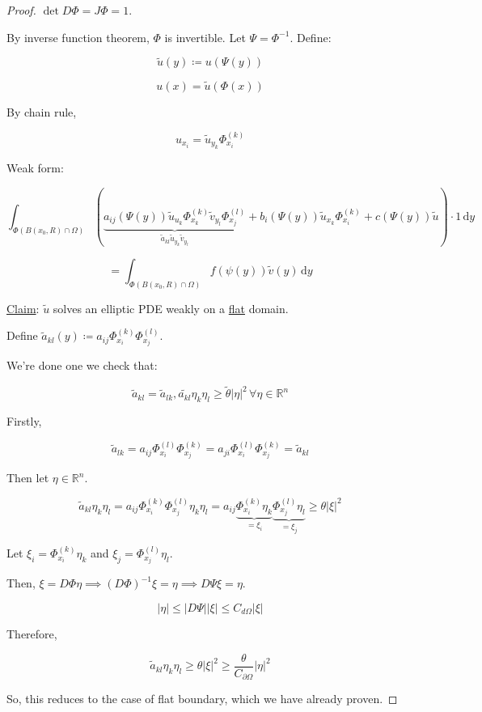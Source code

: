 \documentclass{article}
\theoremstyle{definition}
\begin{document}
\begin{proof}
    \(\det D \Phi = J \Phi = 1\).

    By inverse function theorem, \(\Phi\) is invertible. Let \(\Psi = \Phi ^{-1}\). Define:

    \[
        \widetilde{u} (y) \coloneqq u(\Psi(y))
    \]

    \[
        u(x) = \widetilde{u}(\Phi(x))
    \]

    By chain rule,

    \[
        u_{x_i} = \widetilde{u}_{y_k} \Phi_{x_i} ^{(k)}
    \]

    Weak form:

    \[
        \int_{\Phi(B(x_0,R)\cap \Omega)} \left(\underbrace{a_{ij} (\Psi(y))\widetilde{u}_{u_k} \Phi_{x_k} ^{(k)} \widetilde{v}_{y_l} \Phi_{x_j}^{(l)}}_{\widetilde{a}_{kl} \widetilde{u}_{y_k} \widetilde{v}_{y_l} } + b_i (\Psi(y))\widetilde{u}_{x_k} \Phi^{(k)}_{x_i} + c(\Psi(y)) \widetilde{u}  \right) \cdot 1  \,\mathrm{d}y 
    \]

    \[
        = \int_{\Phi(B(x_0,R)\cap \Omega)} f(\psi(y))\widetilde{v}(y) \,\mathrm{d}y 
    \]

    \underline{Claim}: \(\widetilde{u}\) solves an elliptic PDE weakly on a \underline{flat} domain.

    Define \(\widetilde{a}_{kl}(y) \coloneqq a_{ij} \Phi^{(k)}_{x_i} \Phi^{(l)}_{x_j}\).
    
    We're done one we check that:

    \[
        \widetilde{a}_{kl} = \widetilde{a}_{lk}, \widetilde{a_{kl}} \eta _k \eta_l \geq \widetilde{\theta} \vert \eta \vert ^ 2 \, \forall \eta \in\mathbb{R}^n
    \]

    Firstly,

    \[
        \widetilde{a}_{lk} = a_{ij} \Phi^{(l)}_{x_i} \Phi^{(k)}_{x_j} = a_{ji} \Phi^{(l)}_{x_i}\Phi^{(k)}_{x_j} = \widetilde{a}_{kl}
    \]

    Then let \(\eta\in\mathbb{R}^n\).

    \[
        \widetilde{a}_{kl} \eta_k \eta_l = a_{ij} \Phi^{(k)}_{x_i} \Phi^{(l)}_{x_j} \eta_k \eta_l = a_{ij} \underbrace{\Phi_{x_i}^{(k)}\eta_k}_{=\xi_i} \underbrace{\Phi^{(l)}_{x_j}\eta_l}_{=\xi_j} \geq \theta \vert \xi \vert ^ 2
    \]

    Let \(\xi_i = \Phi^{(k)}_{x_i} \eta_k\) and \(\xi_j = \Phi^{(l)}_{x_j} \eta_l\).
    
    Then, \(\xi = D \Phi \eta \implies (D \Phi)^{-1} \xi = \eta \implies D \Psi \xi = \eta\).
    
    \[
        \vert \eta \vert \leq \vert D \Psi \vert \vert \xi \vert \leq C_{d \Omega} \vert \xi \vert 
    \]

    Therefore,

    \[
        \widetilde{a}_{kl} \eta_k \eta_l \geq \theta \vert \xi \vert ^ 2 \geq \frac{\theta}{C_{\partial \Omega}} \vert \eta \vert ^ 2
    \]

    So, this reduces to the case of flat boundary, which we have already proven.

\end{proof}
\end{document}

